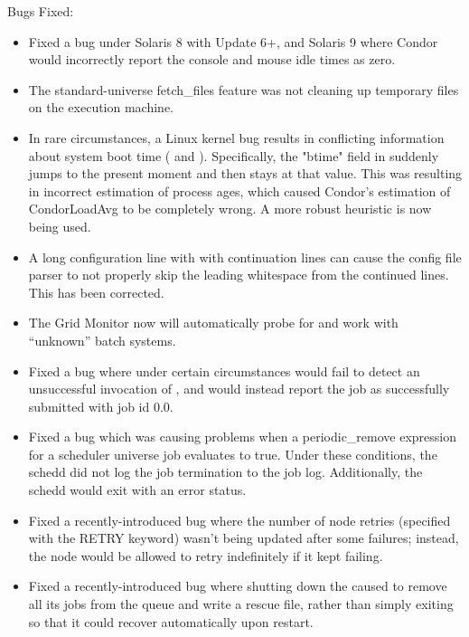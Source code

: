\noindent Bugs Fixed:

\begin{itemize}

\item Fixed a bug under Solaris 8 with Update 6+, and Solaris 9 where
Condor would incorrectly report the console and mouse idle times as zero.

\item The standard-universe fetch\_files feature was not cleaning up
temporary files on the execution machine.

\item In rare circumstances, a Linux kernel bug results in conflicting
information about system boot time ( and
). 
Specifically, the "btime" field in  suddenly jumps to
the present moment and then stays at that value.  This
was resulting in incorrect estimation of process ages, which caused
Condor's estimation of CondorLoadAvg to be completely wrong.  A more
robust heuristic is now being used.

\item A long configuration line with with continuation lines can cause the
config file parser to not properly skip the leading whitespace from
the continued lines.  This has been corrected.

\item The Grid Monitor now will automatically probe for and work with
``unknown'' batch systems.

\item Fixed a bug where under certain circumstances 
      would fail to detect an unsuccessful invocation of
      , and would instead report the job as
      successfully submitted with job id 0.0.

\item Fixed a bug which was causing problems when a periodic\_remove
expression for a scheduler universe job evaluates to true.  Under
these conditions, the schedd did not log the job termination to the
job log.  Additionally, the schedd would exit with an error status.

\item Fixed a recently-introduced  bug where the number
      of node retries (specified with the RETRY keyword) wasn't being
      updated after some failures; instead, the node would be allowed
      to retry indefinitely if it kept failing.

\item Fixed a recently-introduced bug where shutting down the
       caused  to remove all its jobs
      from the queue and write a rescue file, rather than simply
      exiting so that it could recover automatically upon restart.


\end{itemize}
